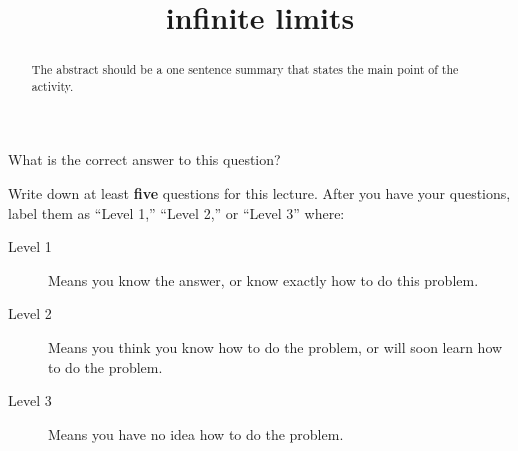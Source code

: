 \documentclass{ximera}
\title{infinite limits}
\begin{document}
\begin{abstract}
  The abstract should be a one sentence summary that states the main point of the activity.
\end{abstract}

\maketitle

\begin{question}
  What is the correct answer to this question?

  
    \begin{multipleChoice}
    \end{multipleChoice}  
  
\end{question}

Write down at least \textbf{five} questions for this lecture. After
you have your questions, label them as ``Level 1,'' ``Level 2,'' or ``Level 3'' where:
\begin{description}
\item[Level 1] Means you know the answer, or know exactly how to do this problem.
\item[Level 2] Means you think you know how to do the problem, or will soon learn how to do the problem.
\item[Level 3] Means you have no idea how to do the problem. 
\end{description}
\begin{question}
  \begin{freeResponse}
  \end{freeResponse}
\end{question}
\end{document}
